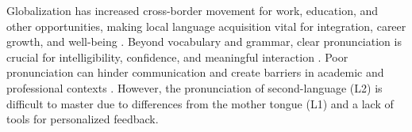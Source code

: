 \documentclass{Interspeech}
\begin{document}
Globalization has increased cross-border movement for work, education, and other opportunities, making local language acquisition vital for integration, career growth, and well-being \cite{zalli2024globalization}. Beyond vocabulary and grammar, clear pronunciation is crucial for intelligibility, confidence, and meaningful interaction \cite{zielinski2012social, jenkins2000phonology}. Poor pronunciation can hinder communication and create barriers in academic and professional contexts \cite{zossadult}. However, the pronunciation of second-language (L2) is difficult to master due to differences from the mother tongue (L1) and a lack of tools for personalized feedback.
\end{document}
